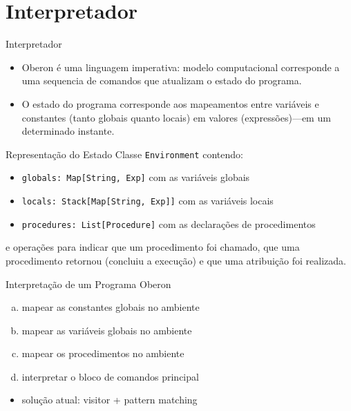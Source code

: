 \documentclass{beamer}
\begin{document}
\section{Interpretador}

\begin{frame}
\huge{Interpretador}
\end{frame}

\begin{frame}
  \begin{itemize}
  \item Oberon \'{e} uma linguagem {\color{blue}imperativa}\pause: modelo
  computacional corresponde a uma sequencia de comandos
  que atualizam o {\color{blue}estado do programa}. \pause

  \item O estado do programa corresponde aos {\color{blue}mapeamentos} entre
  vari\'{a}veis e constantes (tanto globais quanto locais)
  em valores (express\~{o}es)\pause---em um determinado instante.
 \end{itemize} 
\end{frame}

\begin{frame}
  \begin{block}{Representa\c c\~{a}o do Estado}
    Classe \texttt{Environment} contendo: \pause
    \begin{itemize}
     \item \texttt{globals: Map[String, Exp]} com as vari\'{a}veis globais
     \item \texttt{locals: Stack[Map[String, Exp]]} com as vari\'{a}veis locais
     \item \texttt{procedures: List[Procedure]} com as declara\c c\~{o}es de procedimentos   
    \end{itemize} \pause
    e opera\c c\~{o}es para indicar que um procedimento foi chamado, que uma
    procedimento retornou (concluiu a execu\c c\~{a}o) e que uma atribui\c c\~{a}o
    foi realizada. 
  \end{block}  
\end{frame}

\begin{frame}
  \begin{block}{Interpreta\c c\~{a}o de um Programa Oberon}
    \begin{enumerate}[(a)]
     \item mapear as constantes globais no ambiente
     \item mapear as vari\'{a}veis globais no ambiente
     \item mapear os procedimentos no ambiente  
     \item interpretar o bloco de comandos principal \pause
    \end{enumerate}
  \end{block}
  
  \begin{itemize}
   \item solu\c c\~{a}o atual: {\color{blue}visitor} + {\color{blue}pattern matching}  
  \end{itemize}
\end{frame}
\end{document}
